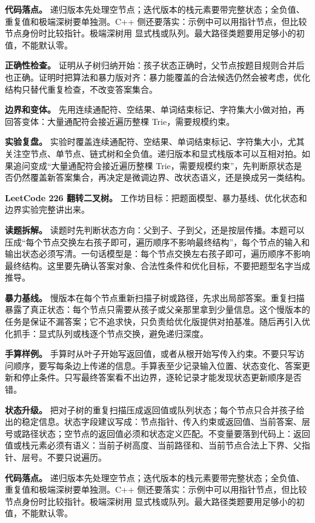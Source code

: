 \textbf{代码落点。} 递归版本先处理空节点；迭代版本的栈元素要带完整状态；全负值、重复值和极端深树要单独测。C++ 侧还要落实：示例中可以用指针节点，但比较节点身份时比较指针。极端深树用  显式栈或队列。最大路径类题要用足够小的初值，不能默认零。

\textbf{正确性检查。} 证明从子树归纳开始：孩子状态正确时，父节点按题目规则合并后也正确。证明时把算法和暴力版对齐：暴力能覆盖的合法候选仍然会被考虑，优化结构只替代重复检查，不改变答案集合。

\textbf{边界和变体。} 先用连续通配符、空结果、单词结束标记、字符集大小做对拍，再回答变体：大量通配符会接近遍历整棵 Trie，需要规模约束。

\textbf{实验复盘。} 实验时覆盖连续通配符、空结果、单词结束标记、字符集大小，尤其关注空节点、单节点、链式树和全负值。递归版本和显式栈版本可以互相对拍。如果追问变成“大量通配符会接近遍历整棵 Trie，需要规模约束”，先判断原状态是否仍然覆盖新答案集合，再决定是微调边界、改状态语义，还是换成另一类结构。

\noindent\textbf{LeetCode 226 翻转二叉树。} 工作坊目标：把题面模型、暴力基线、优化状态和边界实验完整讲出来。

\textbf{读题拆解。} 读题时先判断状态方向：父到子、子到父，还是按层传播。本题可以压成“每个节点交换左右孩子即可，遍历顺序不影响最终结构”，每个节点的输入和输出状态必须写清。一句话模型是：每个节点交换左右孩子即可，遍历顺序不影响最终结构。这里要先确认答案对象、合法性条件和优化目标，不要把题型名字当成推导。

\textbf{暴力基线。} 慢版本在每个节点重新扫描子树或路径，先求出局部答案。重复扫描暴露了真正状态：每个节点只需要从孩子或父亲那里拿到少量信息。这个慢版本的任务是保证不漏答案；它不追求快，只负责给优化版提供对拍基准。随后再引入优化抓手：显式队列或栈逐个节点交换，避免递归深度。

\textbf{手算样例。} 手算时从叶子开始写返回值，或者从根开始写传入约束。不要只写访问顺序，要写每条边上传递的信息。手算表至少记录输入位置、状态变化、答案更新和停止条件。只写最终答案看不出边界，逐轮记录才能发现状态更新顺序是否错。

\textbf{状态升级。} 把对子树的重复扫描压成返回值或队列状态；每个节点只合并孩子给出的稳定信息。状态字段建议写成：节点指针、传入约束或返回值、当前答案、层号或路径状态；空节点的返回值必须和状态定义匹配。不变量要落到代码上：返回值或栈元素必须有语义：当前子树高度、当前路径和、当前节点合法上下界、父指针、层号。不要只说遍历。

\textbf{代码落点。} 递归版本先处理空节点；迭代版本的栈元素要带完整状态；全负值、重复值和极端深树要单独测。C++ 侧还要落实：示例中可以用指针节点，但比较节点身份时比较指针。极端深树用  显式栈或队列。最大路径类题要用足够小的初值，不能默认零。

